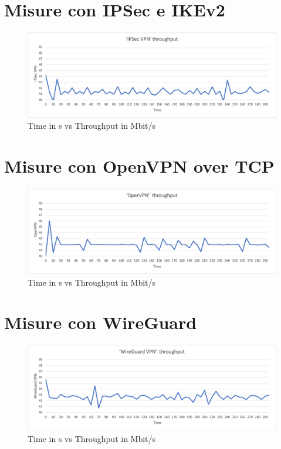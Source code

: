 \section{Misure con IPSec e IKEv2}
\begin{figure}[ht]
    \centering
    \includegraphics[width=12cm]{figure/vpn_thr.png-2.png}
    \caption{Time in s vs Throughput in Mbit/s}
\end{figure}

\section{Misure con OpenVPN over TCP}
\begin{figure}[ht]
    \centering
    \includegraphics[width=12cm]{figure/vpn_thr.png-3.png}
    \caption{Time in s vs Throughput in Mbit/s}
\end{figure}

\section{Misure con WireGuard}
\begin{figure}[ht]
    \centering
    \includegraphics[width=12cm]{figure/vpn_thr.png-4.png}
    \caption{Time in s vs Throughput in Mbit/s}
\end{figure}

